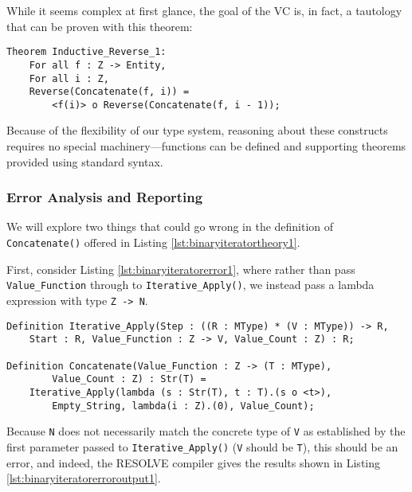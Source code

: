 

While it seems complex at first glance, the goal of the VC is, in fact, a tautology that can be proven with this theorem:

\begin{lstlisting}
Theorem Inductive_Reverse_1:
	For all f : Z -> Entity,
	For all i : Z,
	Reverse(Concatenate(f, i)) = 
		<f(i)> o Reverse(Concatenate(f, i - 1));
\end{lstlisting}

Because of the flexibility of our type system, reasoning about these constructs requires no special machinery---functions can be defined and supporting theorems provided using standard syntax.

		\subsubsection{Error Analysis and Reporting}	

We will explore two things that could go wrong in the definition of \texttt{Concatenate()} offered in Listing \ref{lst:binaryiteratortheory1}.

First, consider Listing \ref{lst:binaryiteratorerror1}, where rather than pass \texttt{Value\_Function} through to \texttt{Iterative\_Apply()}, we instead pass a lambda expression with type \texttt{Z -> N}.

\begin{lstlisting}[float=h,language=resolve,caption={Passing an incorrectly-typed \texttt{Value\_Function}\label{lst:binaryiteratorerror1}}]
Definition Iterative_Apply(Step : ((R : MType) * (V : MType)) -> R,
	Start : R, Value_Function : Z -> V, Value_Count : Z) : R;

Definition Concatenate(Value_Function : Z -> (T : MType), 
		Value_Count : Z) : Str(T) = 
	Iterative_Apply(lambda (s : Str(T), t : T).(s o <t>),
		Empty_String, lambda(i : Z).(0), Value_Count);
\end{lstlisting}

Because \texttt{N} does not necessarily match the concrete type of \texttt{V} as established by the first parameter passed to \texttt{Iterative\_Apply()} (\texttt{V} should be \texttt{T}), this should be an error, and indeed, the RESOLVE compiler gives the results shown in Listing \ref{lst:binaryiteratorerroroutput1}.

